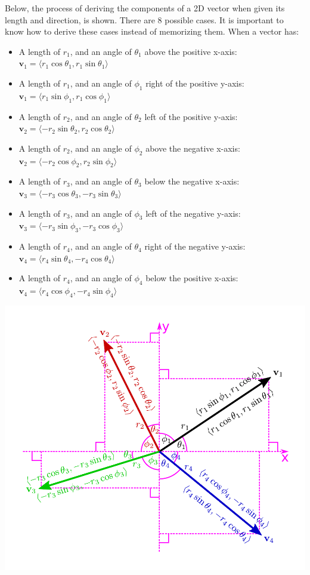 \documentclass{article}
\begin{document}
Below, the process of deriving the components of a 2D vector when given its length and direction, is shown. There are 8 possible cases. It is important to know how to derive these cases instead of memorizing them. When a vector has:
\begin{itemize}
\item A length of \(r_1\), and an angle of \(\theta_1\) above the positive x-axis: \(\mathbf{v}_1 = \langle r_1\cos\theta_1, r_1\sin\theta_1 \rangle\)
\item A length of \(r_1\), and an angle of \(\phi_1\) right of the positive y-axis: \(\mathbf{v}_1 = \langle r_1\sin\phi_1, r_1\cos\phi_1 \rangle\)
\item A length of \(r_2\), and an angle of \(\theta_2\) left of the positive y-axis: \(\mathbf{v}_2 = \langle -r_2\sin\theta_2, r_2\cos\theta_2 \rangle\)
\item A length of \(r_2\), and an angle of \(\phi_2\) above the negative x-axis: \(\mathbf{v}_2 = \langle -r_2\cos\phi_2, r_2\sin\phi_2 \rangle\)
\item A length of \(r_3\), and an angle of \(\theta_3\) below the negative x-axis: \(\mathbf{v}_3 = \langle -r_3\cos\theta_3, -r_3\sin\theta_3 \rangle\)
\item A length of \(r_3\), and an angle of \(\phi_3\) left of the negative y-axis: \(\mathbf{v}_3 = \langle -r_3\sin\phi_3, -r_3\cos\phi_3 \rangle\)
\item A length of \(r_4\), and an angle of \(\theta_4\) right of the negative y-axis: \(\mathbf{v}_4 = \langle r_4\sin\theta_4, -r_4\cos\theta_4 \rangle\)
\item A length of \(r_4\), and an angle of \(\phi_4\) below the positive x-axis: \(\mathbf{v}_4 = \langle r_4\cos\phi_4, -r_4\sin\phi_4 \rangle\)
\end{itemize}
\includegraphics[width = \textwidth]{polar_vector_to_cartesian_vector}
\end{document}
